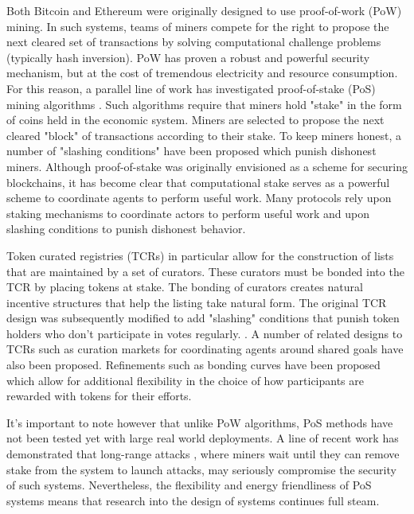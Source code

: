 \documentclass{llncs}
\begin{document}
Both Bitcoin and Ethereum were originally designed to use proof-of-work (PoW) mining. In such systems, teams of miners compete for the right to propose the next cleared set of transactions by solving computational challenge problems (typically hash inversion). PoW has proven a robust and powerful security mechanism, but at the cost of tremendous electricity and resource consumption. For this reason, a parallel line of work has investigated proof-of-stake (PoS) mining algorithms \cite{king2012ppcoin, kiayias2017ouroboros, buterin2017casper}. Such algorithms require that miners hold "stake" in the form of coins held in the economic system. Miners are selected to propose the next cleared "block" of transactions according to their stake. To keep miners honest, a number of "slashing conditions" \cite{buterin2017casper} have been proposed which punish dishonest miners. Although proof-of-stake was originally envisioned as a scheme for securing blockchains, it has become clear that computational stake serves as a powerful scheme to coordinate agents to perform useful work. Many protocols \cite{peterson2015augur, teutsch2017scalable, goldin2017tcr, goldin2018tcr11} rely upon staking mechanisms to coordinate actors to perform useful work and upon slashing conditions to punish dishonest behavior.

Token curated registries \cite{goldin2017tcr} (TCRs) in particular allow for the construction of lists that are maintained by a set of curators. These curators must be bonded into the TCR by placing tokens at stake. The bonding of curators creates natural incentive structures that help the listing take natural form. The original TCR design was subsequently modified to add "slashing" conditions that punish token holders who don't participate in votes regularly. \cite{goldin2018tcr11}. A number of related designs to TCRs such as curation markets for coordinating agents around shared goals \cite{delarouviere2017curation, delarouviere2017curationmarkets} have also been proposed. Refinements such as bonding curves \cite{delarouviere2017tokens2} have been proposed which allow for additional flexibility in the choice of how participants are rewarded with tokens for their efforts.


It's important to note however that unlike PoW algorithms, PoS methods have not been tested yet with large real world deployments. A line of recent work has demonstrated that long-range attacks \cite{gazi2018stake}, where miners wait until they can remove stake from the system to launch attacks, may seriously compromise the security of such systems. Nevertheless, the flexibility and energy friendliness of PoS systems means that research into the design of systems continues full steam.
\end{document}
